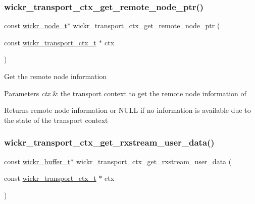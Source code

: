 \subsubsection{\texorpdfstring{wickr\+\_\+transport\+\_\+ctx\+\_\+get\+\_\+remote\+\_\+node\+\_\+ptr()}{wickr\_transport\_ctx\_get\_remote\_node\_ptr()}}
{\footnotesize\ttfamily const \mbox{\hyperlink{structwickr__node}{wickr\+\_\+node\+\_\+t}}$\ast$ wickr\+\_\+transport\+\_\+ctx\+\_\+get\+\_\+remote\+\_\+node\+\_\+ptr (\begin{DoxyParamCaption}\item[{const \mbox{\hyperlink{structwickr__transport__ctx}{wickr\+\_\+transport\+\_\+ctx\+\_\+t}} $\ast$}]{ctx }\end{DoxyParamCaption})}

Get the remote node information


\begin{DoxyParams}{Parameters}
{\em ctx} & the transport context to get the remote node information of \\
\hline
\end{DoxyParams}
\begin{DoxyReturn}{Returns}
remote node information or N\+U\+LL if no information is available due to the state of the transport context 
\end{DoxyReturn}
\mbox{\label{group__wickr__transport__ctx_ga3ec320d2e4a4010ffa3f411c1ea1419a}} 
\subsubsection{\texorpdfstring{wickr\+\_\+transport\+\_\+ctx\+\_\+get\+\_\+rxstream\+\_\+user\+\_\+data()}{wickr\_transport\_ctx\_get\_rxstream\_user\_data()}}
{\footnotesize\ttfamily const \mbox{\hyperlink{structwickr__buffer}{wickr\+\_\+buffer\+\_\+t}}$\ast$ wickr\+\_\+transport\+\_\+ctx\+\_\+get\+\_\+rxstream\+\_\+user\+\_\+data (\begin{DoxyParamCaption}\item[{const \mbox{\hyperlink{structwickr__transport__ctx}{wickr\+\_\+transport\+\_\+ctx\+\_\+t}} $\ast$}]{ctx }\end{DoxyParamCaption})}

